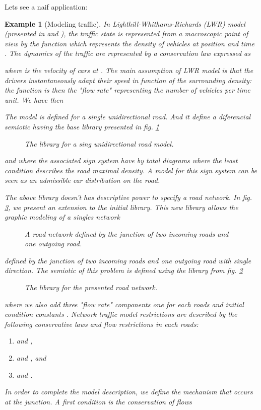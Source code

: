 \documentclass[oribibl]{llncs}
\newtheorem{exam}{Example}
\begin{document}
Lets  see a naif application:
\begin{exam}[Modeling traffic]
In Lighthill-Whithams-Richards (LWR) model (presented in \cite{Lighthill55} and \cite{Richards56}), the traffic state is represented from a macroscopic point of view by the function  which represents the density of vehicles at position  and time . The dynamics of the traffic are represented by a conservation law expressed as

where  is the velocity of cars at . The main assumption of LWR model is that the drivers instantaneously adapt their speed in function of the surrounding density:
 the function  is then the "flow rate" representing the number of vehicles per time unit. We have then

The model is defined for a single unidirectional road. And it define a diferencial semiotic having the base library presented in fig. \ref{baselibary}
\begin{figure}[h]

\caption{The library for a sing unidirectional road model.}\label{baselibary}
\end{figure}
and where the associated sign system have by total diagrams
 where the least condition describes the road maximal density. A model for this sign system can be seen as an admissible car distribution on the road.

The above library doesn't has descriptive power to specify a road network. In fig. \ref{networklibrary}, we present an extension to the initial library. This new library allows the graphic modeling of a singles network
\begin{figure}[h]

\caption{A road network defined by the junction of two incoming roads and one outgoing road.}\label{network}
\end{figure}
defined by the junction of two incoming roads  and one outgoing road  with single direction. The semiotic of this problem is defined using the library from fig. \ref{networklibrary}
\begin{figure}[h]

\caption{The library for the presented road network.}\label{networklibrary}
\end{figure}
where we also add three "flow rate" components  one for each roads and initial condition constants . Network traffic model restrictions are described by the following conservative laws and flow restrictions in each roads:
\begin{enumerate}
  \item   and ,
  \item   and , and
  \item   and .
\end{enumerate}
In order to complete the model description, we define the mechanism that occurs at the junction. A first condition is the conservation of flows


\end{exam}
\end{document}
